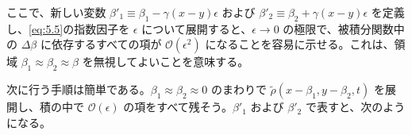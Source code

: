 ここで、新しい変数 $\beta'_1\equiv\beta_1-\gamma(x-y)\epsilon$ および $\beta'_2\equiv\beta_2+\gamma(x-y)\epsilon$ を定義し、\eqref{eq:5.5}の指数因子を $\epsilon$ について展開すると、$\epsilon\to0$ の極限で、被積分関数中の $\Delta\beta$ に依存するすべての項が $\mathcal O(\epsilon^2)$ になることを容易に示せる。これは、領域 $\beta_1\approx\beta_2\approx\beta$ を無視してよいことを意味する。

次に行う手順は簡単である。$\beta_1\approx\beta_2\approx0$ のまわりで $\widetilde\rho(x-\beta_1,y-\beta_2,t)$ を展開し、積の中で $\mathcal O(\epsilon)$ の項をすべて残そう。$\beta'_1$ および $\beta'_2$ で表すと、次のようになる。
